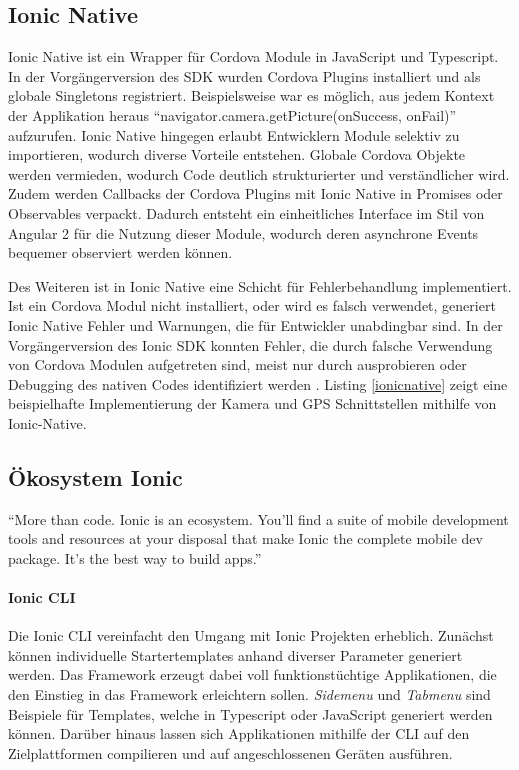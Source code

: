 \subsection{Ionic Native}

Ionic Native ist ein Wrapper für Cordova Module in JavaScript und Typescript.
In der Vorgängerversion des \ac{SDK} wurden Cordova Plugins installiert und als globale Singletons registriert.
Beispielsweise war es möglich, aus jedem Kontext der Applikation heraus ``navigator.camera.getPicture(onSuccess, onFail)'' aufzurufen.
Ionic Native hingegen erlaubt Entwicklern Module selektiv zu importieren, wodurch diverse Vorteile entstehen.
Globale Cordova Objekte werden vermieden, wodurch Code deutlich strukturierter und verständlicher wird.
Zudem werden Callbacks der Cordova Plugins mit Ionic Native in Promises oder Observables verpackt.
Dadurch entsteht ein einheitliches Interface im Stil von Angular 2 für die Nutzung dieser Module,
wodurch deren asynchrone Events bequemer observiert werden können.

Des Weiteren ist in Ionic Native eine Schicht für Fehlerbehandlung implementiert.
Ist ein Cordova Modul nicht installiert, oder wird es falsch verwendet,
generiert Ionic Native Fehler und Warnungen, die für Entwickler unabdingbar sind.
In der Vorgängerversion des Ionic \ac{SDK} konnten Fehler, die durch falsche Verwendung von
Cordova Modulen aufgetreten sind, meist nur durch ausprobieren oder Debugging des nativen Codes identifiziert werden
\cite{ionic55:online}.
Listing \ref{ionicnative} zeigt eine beispielhafte Implementierung der Kamera und GPS Schnittstellen mithilfe von Ionic-Native.

\vspace{0.3cm}



\subsection{Ökosystem Ionic}

``More than code. Ionic is an ecosystem. You'll find a suite of mobile development tools and resources at your disposal that make
Ionic the complete mobile dev package. It's the best way to build apps.'' \cite{Ionic20:online}
\vspace{0.5cm}

\paragraph{Ionic \ac{CLI}}
Die Ionic \ac{CLI} vereinfacht den Umgang mit Ionic Projekten erheblich. Zunächst können individuelle
Startertemplates anhand diverser Parameter generiert werden.
Das Framework erzeugt dabei voll funktionstüchtige Applikationen, die den Einstieg in das Framework erleichtern sollen.
\emph{Sidemenu} und \emph{Tabmenu} sind Beispiele für Templates, welche in Typescript oder JavaScript generiert werden können.
Darüber hinaus lassen sich Applikationen mithilfe der \ac{CLI} auf den Zielplattformen compilieren und auf angeschlossenen Geräten ausführen.

